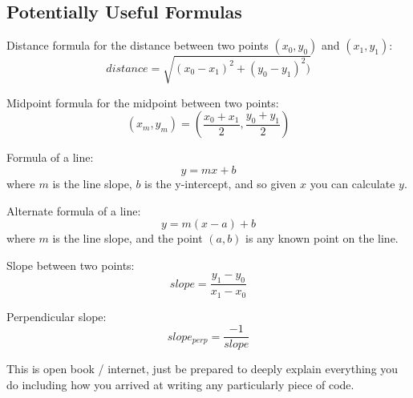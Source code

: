 \documentclass[12pt]{article}
\newcommand{\nl}{\newline}
\begin{document}
\subsection*{Potentially Useful Formulas}

\noindent
Distance formula for the distance between two points $(x_0, y_0)$ and $(x_1,
y_1)$:
$$distance = \sqrt{(x_0 - x_1)^2 + (y_0 - y_1)^2)}$$

\noindent\nl
Midpoint formula for the midpoint between two points:
$$(x_m, y_m) = (\frac{x_0+x_1}{2}, \frac{y_0+y_1}{2})$$

\noindent\nl
Formula of a line:
$$y = mx + b$$ 
where $m$ is the line slope, $b$ is the
y-intercept, and so given $x$ you can calculate $y$.

\noindent\nl
Alternate formula of a line:
$$y = m(x-a)+b$$
where $m$ is the line slope, and the
point $(a,b)$ is any known point on the line.

\noindent\nl
Slope between two points:
$$slope = \frac{y_1 - y_0}{x_1 - x_0}$$

\noindent\nl
Perpendicular slope:
$$slope_{perp} = \frac{-1}{slope}$$

This is open book / internet, just be prepared to deeply explain everything you
do including how you arrived at writing any particularly piece of code.
\end{document}
